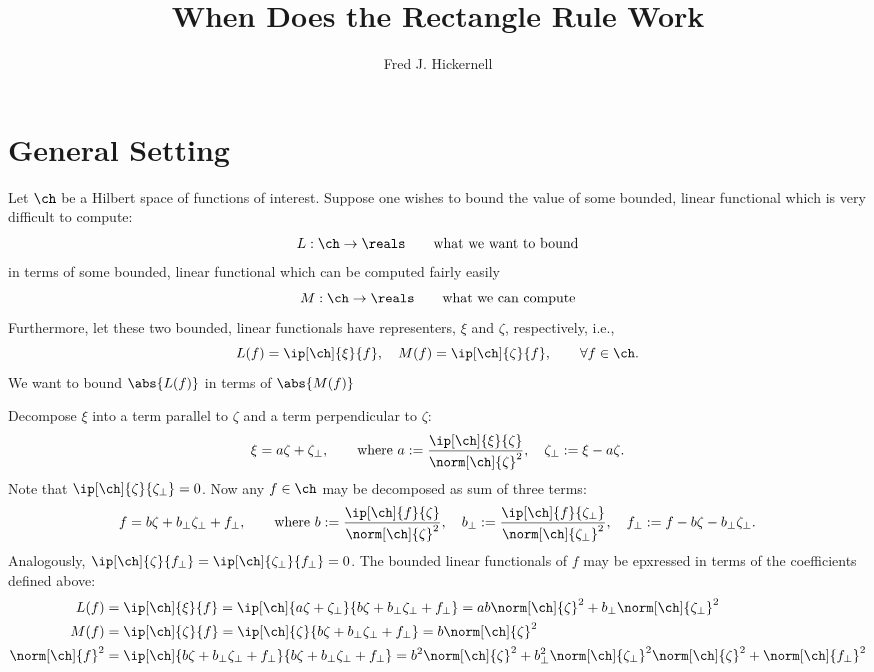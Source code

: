 \documentclass[12pt]{amsart}
\begin{document}
\title{When Does the Rectangle Rule Work}
\author{Fred J. Hickernell}
\address{Room E1-208, Department of Applied Mathematics, Illinois Institute of Technology, 10 W.\ 32$^{\text{nd}}$ St., Chicago, IL 60616}
\begin{abstract}
\end{abstract}
\maketitle

\section{General Setting}
Let $\ch$ be a Hilbert space of functions of interest.  Suppose one wishes to bound the value of some bounded, linear functional which is very difficult to compute:
\[
L:\ch \to \reals \qquad \text{what we want to bound}
\]
in terms of some bounded, linear functional which can be computed fairly easily
\[
M:\ch \to \reals \qquad \text{what we can compute}
\]
Furthermore, let these two bounded, linear functionals have representers, $\xi$ and $\zeta$, respectively, i.e., 
\[
L(f) = \ip[\ch]{\xi}{f}, \quad M(f) = \ip[\ch]{\zeta}{f}, \qquad \forall f \in \ch.
\]
We want to bound $\abs{L(f)}$ in terms of $\abs{M(f)}$

Decompose $\xi$ into a term parallel to $\zeta$ and a term perpendicular to $\zeta$:
\[
\xi = a \zeta + \zeta_{\perp}, \qquad \text{where } a := \frac{\ip[\ch]{\xi}{\zeta}}{\norm[\ch]{\zeta}^2}, \quad \zeta_{\perp} := \xi - a \zeta.
\]
Note that $\ip[\ch]{\zeta}{\zeta_{\perp}} = 0$.  Now any $f \in \ch$ may be decomposed as sum of three terms:
\[
f = b \zeta + b_{\perp} \zeta_{\perp} + f_{\perp}, \qquad \text{where } b := \frac{\ip[\ch]{f}{\zeta}}{\norm[\ch]{\zeta}^2}, \quad b_{\perp} := \frac{\ip[\ch]{f}{\zeta_{\perp}}}{\norm[\ch]{\zeta_{\perp}}^2}, \quad f_{\perp} := f - b \zeta -  b_{\perp} \zeta_{\perp}.
\]
Analogously, $\ip[\ch]{\zeta}{f_{\perp}} = \ip[\ch]{\zeta_{\perp}}{f_{\perp}} = 0$.  The bounded linear functionals of $f$ may be epxressed in terms of the coefficients defined above:
\begin{align*}
L(f)&=\ip[\ch]{\xi}{f}= \ip[\ch]{a \zeta + \zeta_{\perp}}{b \zeta + b_{\perp} \zeta_{\perp} + f_{\perp}} = ab \norm[\ch]{\zeta}^2 +  b_{\perp} \norm[\ch]{\zeta_{\perp}}^2 \\
M(f)&=\ip[\ch]{\zeta}{f}= \ip[\ch]{\zeta}{b \zeta + b_{\perp} \zeta_{\perp} + f_{\perp}} = b \norm[\ch]{\zeta}^2 \\
\norm[\ch]{f}^2&= \ip[\ch]{b \zeta + b_{\perp} \zeta_{\perp} + f_{\perp}}{b \zeta + b_{\perp} \zeta_{\perp} + f_{\perp}} =b^2 \norm[\ch]{\zeta}^2 +  b_{\perp}^2 \norm[\ch]{\zeta_{\perp}}^2  \norm[\ch]{\zeta}^2 + \norm[\ch]{f_{\perp}}^2
\end{align*}
\end{document}
